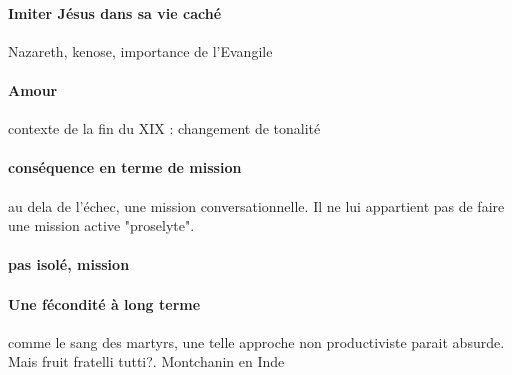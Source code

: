 \paragraph{Imiter Jésus dans sa vie caché} Nazareth, kenose, importance de l'Evangile



\paragraph{Amour} contexte de la fin du XIX : changement de tonalité

\paragraph{conséquence en terme de mission} au dela de l'échec, une mission conversationnelle. Il ne lui appartient pas de faire une mission active "proselyte".

\paragraph{pas isolé, mission}

\paragraph{Une fécondité à long terme} comme le sang des martyrs, une telle approche non productiviste parait absurde. Mais fruit fratelli tutti?.
Montchanin en Inde

